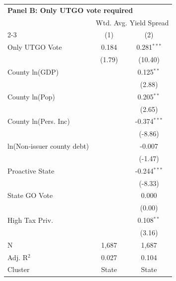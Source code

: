 \begingroup
\centering
\begin{tabular*}{\textwidth}{@{\extracolsep{\fill}}lcc}
\multicolumn{5}{l}{\textbf{Panel B: Only UTGO vote required}}\\

\addlinespace
   \toprule
    & \multicolumn{2}{c}{Wtd. Avg. Yield Spread}\\
   \cmidrule(lr){2-3}
                              & (1)    & (2)\\  
   \midrule 
   Only UTGO Vote             & 0.184  & 0.281$^{***}$\\   
                              & (1.79) & (10.40)\\   
   County ln(GDP)             &        & 0.125$^{**}$\\   
                              &        & (2.88)\\   
   County ln(Pop)             &        & 0.205$^{**}$\\   
                              &        & (2.65)\\   
   County ln(Pers. Inc)       &        & -0.374$^{***}$\\   
                              &        & (-8.86)\\   
   ln(Non-issuer county debt) &        & -0.007\\   
                              &        & (-1.47)\\   
   Proactive State            &        & -0.244$^{***}$\\   
                              &        & (-8.33)\\   
   State GO Vote              &        & $0.000$\\    
                              &        & (0.00)\\   
   High Tax Priv.             &        & 0.108$^{**}$\\   
                              &        & (3.16)\\   
   \hline
   N               & 1,687  & 1,687\\  
   Adj. R$^2$             & 0.027  & 0.104\\  
   Cluster              & State & State\\  
   \bottomrule
\end{tabular*}
\par\endgroup
